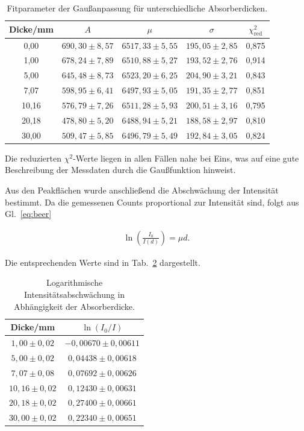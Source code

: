 \begin{table}[htbp]
\centering
\caption{Fitparameter der Gaußanpassung für unterschiedliche Absorberdicken.}
\begin{tabular}{ccccc}
\hline
Dicke/mm  & $A$ & $\mu$ & $\sigma$ & $\chi^2_\mathrm{red}$ \\
\hline
0,00 & $690,30 \pm 8,57$ & $6517,33 \pm 5,55$ & $195,05 \pm 2,85$ & 0,875 \\
1,00 & $678,24 \pm 7,89$ & $6510,88 \pm 5,27$ & $193,52 \pm 2,76$ & 0,914 \\
5,00 & $645,48 \pm 8,73$ & $6523,20 \pm 6,25$ & $204,90 \pm 3,21$ & 0,843 \\
7,07 & $598,95 \pm 6,41$ & $6497,93 \pm 5,05$ & $191,35 \pm 2,77$ & 0,851 \\
10,16 & $576,79 \pm 7,26$ & $6511,28 \pm 5,93$ & $200,51 \pm 3,16$ & 0,795 \\
20,18 & $478,80 \pm 5,20$ & $6488,94 \pm 5,21$ & $188,58 \pm 2,97$ & 0,810 \\
30,00 & $509,47 \pm 5,85$ & $6496,79 \pm 5,49$ & $192,84 \pm 3,05$ & 0,824 \\
\hline
\end{tabular}
\label{tab:gauss_parameter_cssp}
\end{table}

Die reduzierten $\chi^2$-Werte liegen in allen Fällen nahe bei Eins, was auf eine gute Beschreibung der Messdaten durch die Gaußfunktion hinweist.

Aus den Peakflächen wurde anschließend die Abschwächung der Intensität bestimmt. 
Da die gemessenen Counts proportional zur Intensität sind, folgt aus Gl.~\ref{eq:beer}

\begin{align}
    \ln\left(\frac{I_0}{I(d)}\right)
    =
    \mu d.
\end{align}

Die entsprechenden Werte sind in Tab.~\ref{tab:totw} dargestellt.

\begin{table}[htbp]
\centering
\caption{Logarithmische Intensitätsabschwächung in Abhängigkeit der Absorberdicke.}
\begin{tabular}{cc}
\hline
Dicke/mm & $\ln(I_0/I)$ \\
\hline
$1,00 \pm 0,02$ & $-0,00670 \pm 0,00611$ \\
$5,00 \pm 0,02$ & $0,04438 \pm 0,00618$ \\
$7,07 \pm 0,08$ & $0,07692 \pm 0,00626$ \\
$10,16 \pm 0,02$ & $0,12430 \pm 0,00631$ \\
$20,18 \pm 0,02$ & $0,27400 \pm 0,00661$ \\
$30,00 \pm 0,02$ & $0,22340 \pm 0,00651$ \\
\hline
\end{tabular}
\label{tab:totw}
\end{table}

